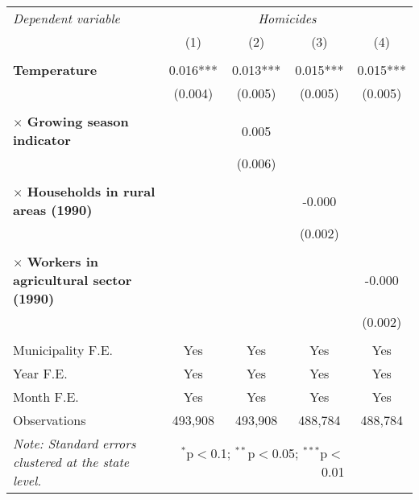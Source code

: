 \begin{tabular}{lcccc}
\hline\hline
\multicolumn{1}{l}{\textit{Dependent variable}} &\multicolumn{4}{c}{\textit{Homicides}} \\

\cmidrule(lr){1-1}  \cmidrule(lr){2-5} 

&\multicolumn{1}{c}{(1)}&\multicolumn{1}{c}{(2)}&\multicolumn{1}{c}{(3)}&\multicolumn{1}{c}{(4)}\\

\\

\textbf{Temperature} & 0.016*** & 0.013*** & 0.015*** & 0.015*** \\
& (0.004) & (0.005) & (0.005) & (0.005) \\								
\\
  
\hspace{4pt} $\times$ \textbf{Growing season indicator} & & 0.005 \\
& & (0.006) \\										
\\

\hspace{4pt} $\times$ \textbf{Households in rural areas (1990)} &  &  & -0.000 \\
& & & (0.002) \\
\\
  
\hspace{4pt} $\times$ \textbf{Workers in agricultural sector (1990)} &  &  &  & -0.000 \\
&  &  &  & (0.002) \\									
\\

Municipality F.E. & Yes & Yes & Yes & Yes \\
Year F.E. & Yes & Yes & Yes & Yes \\ 
Month F.E. & Yes & Yes & Yes & Yes \\
Observations & 493,908 & 493,908 & 488,784 & 488,784\\
\hline\hline
\textit{Note: Standard errors clustered at the state level.} & \multicolumn{3}{r}{$^{*}$p$<$0.1; $^{**}$p$<$0.05; $^{***}$p$<$0.01} \\
\end{tabular} 